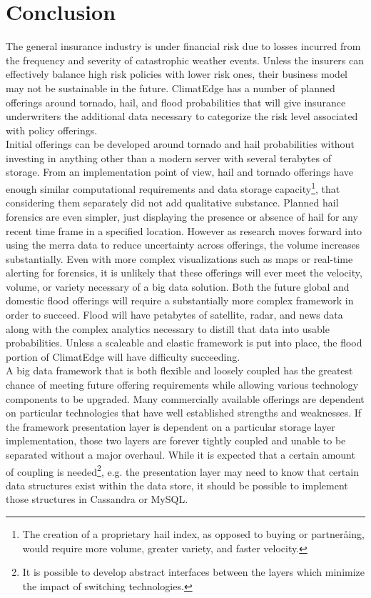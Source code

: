 \section{Conclusion}
The general insurance industry is under financial risk due to losses incurred from the frequency and severity of catastrophic weather events. Unless the insurers can effectively balance high risk policies with lower risk ones, their business model may not be sustainable in the future. ClimatEdge has a number of planned offerings around tornado, hail, and flood probabilities that will give insurance underwriters the additional data necessary to categorize the risk level associated with policy offerings.\\

Initial offerings can be developed around tornado and hail probabilities without investing in anything other than a modern server with several terabytes of storage. From an implementation point of view, hail and tornado offerings have enough similar computational requirements and data storage capacity\footnote{The creation of a proprietary hail index, as opposed to buying or partneråing, would require more volume, greater variety, and faster velocity.}, that considering them separately did not add qualitative substance. Planned hail forensics are even simpler, just displaying the presence or absence of hail for any recent time frame in a specified location. However as research moves forward into using the \gls{merra} data to reduce uncertainty across offerings, the volume increases substantially. Even with more complex visualizations such as maps or real-time alerting for forensics, it is unlikely that these offerings will ever meet the velocity, volume, or variety necessary of a big data solution. Both the future global and domestic flood offerings will require a substantially more complex framework in order to succeed. Flood will have petabytes of satellite, radar, and news data along with the complex analytics necessary to distill that data into usable probabilities. Unless a scaleable and elastic framework is put into place, the flood portion of ClimatEdge will have difficulty succeeding.\\

A big data framework that is both flexible and loosely coupled has the greatest chance of meeting future offering requirements while allowing various technology components to be upgraded. Many commercially available offerings are dependent on particular technologies that have well established strengths and weaknesses. If the framework presentation layer is dependent on a particular storage layer implementation, those two layers are forever tightly coupled and unable to be separated without a major overhaul. While it is expected that a certain amount of coupling is needed\footnote{It is possible to develop abstract interfaces between the layers which minimize the impact of switching technologies.}, e.g. the presentation layer may need to know that certain data structures exist within the data store, it should be possible to implement those structures in Cassandra or MySQL.\\

